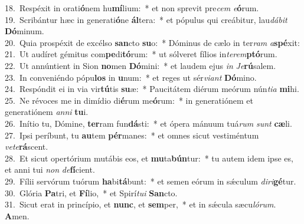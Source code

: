 {18.~}Respéxit in orati\textbf{ó}nem hu\textbf{mí}lium:~* et non sprevit pre\textit{cem} \textit{e}\textbf{ó}rum.\\
{19.~}Scribántur hæc in generati\textbf{ó}ne \textbf{ál}tera:~* et pópulus qui creábitur, lau\textit{dá}\textit{bit} \textbf{Dó}minum.\\
{20.~}Quia prospéxit de excélso \textbf{san}cto \textbf{su}o:~* Dóminus de cælo in ter\textit{ram} \textit{a}\textbf{spé}xit:\\
{21.~}Ut audíret gémitus com\textbf{pe}di\textbf{tó}rum:~* ut sólveret fílios in\textit{te}\textit{rem}\textbf{ptó}rum.\\
{22.~}Ut annúntient in Sion \textbf{no}men \textbf{Dó}mini:~* et laudem ejus \textit{in} \textit{Je}\textbf{rú}salem.\\
{23.~}In conveniéndo pópu\textbf{los} in \textbf{u}num:~* et reges ut sér\textit{vi}\textit{ant} \textbf{Dó}mino.\\
{24.~}Respóndit ei in via vir\textbf{tú}tis \textbf{su}æ:~* Paucitátem diérum meórum nún\textit{ti}\textit{a} \textbf{mi}hi.\\
{25.~}Ne révoces me in dimídio di\textbf{é}rum me\textbf{ó}rum:~* in generatiónem et generatiónem \textit{an}\textit{ni} \textbf{tu}i.\\
{26.~}Inítio tu, Dómine, \textbf{ter}ram fun\textbf{dá}sti:~* et ópera mánuum tuá\textit{rum} \textit{sunt} \textbf{cæ}li.\\
{27.~}Ipsi períbunt, tu \textbf{au}tem \textbf{pér}manes:~* et omnes sicut vestiméntum \textit{ve}\textit{te}\textbf{rá}scent.\\
{28.~}Et sicut opertórium mutábis eos, et \textbf{mu}ta\textbf{bún}tur:~* tu autem idem ipse es, et anni tui \textit{non} \textit{de}\textbf{fí}cient.\\
{29.~}Fílii servórum tuórum \textbf{ha}bi\textbf{tá}bunt:~* et semen eórum in sǽculum \textit{di}\textit{ri}\textbf{gé}tur.\\
{30.~}Glória \textbf{Pa}tri, et \textbf{Fí}lio,~* et Spirí\textit{tu}\textit{i} \textbf{San}cto.\\
{31.~}Sicut erat in princípio, et \textbf{nunc}, et \textbf{sem}per,~* et in sǽcula sæcu\textit{ló}\textit{rum}. \textbf{A}men.\\
